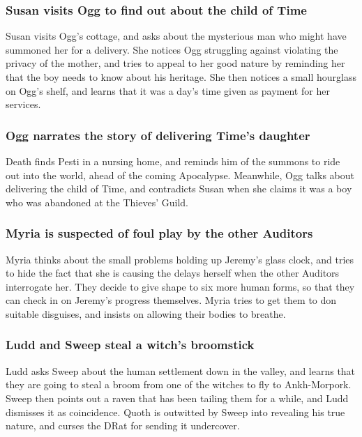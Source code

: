 \subsubsection{\Gls{Susan} visits \Gls{Ogg} to find out about the child of \Gls{Time}}
\Gls{Susan} visits \Gls{Ogg}'s cottage, and asks about the mysterious man who might have summoned
her for a delivery. She notices \Gls{Ogg} struggling against violating the privacy of the mother,
and tries to appeal to her good nature by reminding her that the boy needs to know about his
heritage. She then notices a small hourglass on \Gls{Ogg}'s shelf, and learns that it was a day's
time given as payment for her services.

\subsubsection{\Gls{Ogg} narrates the story of delivering \Gls{Time}'s daughter}
\Gls{Death} finds \Gls{Pesti} in a nursing home, and reminds him of the summons to ride out into
the world, ahead of the coming Apocalypse. Meanwhile, \Gls{Ogg} talks about delivering the child of
\Gls{Time}, and contradicts \Gls{Susan} when she claims it was a boy who was abandoned at the
Thieves' Guild.

\subsubsection{\Gls{Myria} is suspected of foul play by the other Auditors}
\Gls{Myria} thinks about the small problems holding up \Gls{Jeremy}'s glass clock, and tries to
hide the fact that she is causing the delays herself when the other Auditors interrogate her. They
decide to give shape to six more human forms, so that they can check in on \Gls{Jeremy}'s progress
themselves. \Gls{Myria} tries to get them to don suitable disguises, and insists on allowing their
bodies to breathe.

\subsubsection{\Gls{Ludd} and \Gls{Sweep} steal a witch's broomstick}
\Gls{Ludd} asks \Gls{Sweep} about the human settlement down in the valley, and learns that they are
going to steal a broom from one of the witches to fly to Ankh-Morpork. \Gls{Sweep} then points out
a raven that has been tailing them for a while, and \Gls{Ludd} dismisses it as coincidence.
\Gls{Quoth} is outwitted by \Gls{Sweep} into revealing his true nature, and curses the \Gls{DRat}
for sending it undercover.

